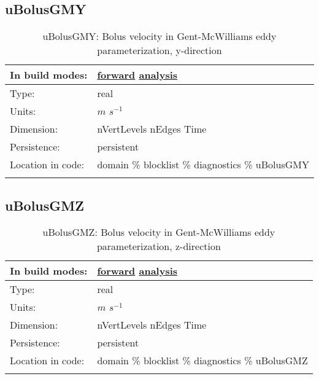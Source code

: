 \subsection[uBolusGMY]{uBolusGMY}
\label{subsec:var_sec_diagnostics_uBolusGMY}
\begin{center}
\begin{longtable}{| p{2.0in} | p{4.0in} |}
        \hline 
        In build modes: & \hyperref[subsec:forward_var_tab_diagnostics]{forward} \hyperref[subsec:analysis_var_tab_diagnostics]{analysis} \\
        \hline 
        Type: & real \\
        \hline 
        Units: & $m$ $s^{-1}$ \\
        \hline 
        Dimension: & nVertLevels nEdges Time \\
        \hline 
        Persistence: & persistent \\
        \hline 
		 Location in code: & domain \% blocklist \% diagnostics \% uBolusGMY \\
		 \hline 
    \caption{uBolusGMY: Bolus velocity in Gent-McWilliams eddy parameterization, y-direction}
\end{longtable}
\end{center}
\subsection[uBolusGMZ]{uBolusGMZ}
\label{subsec:var_sec_diagnostics_uBolusGMZ}
\begin{center}
\begin{longtable}{| p{2.0in} | p{4.0in} |}
        \hline 
        In build modes: & \hyperref[subsec:forward_var_tab_diagnostics]{forward} \hyperref[subsec:analysis_var_tab_diagnostics]{analysis} \\
        \hline 
        Type: & real \\
        \hline 
        Units: & $m$ $s^{-1}$ \\
        \hline 
        Dimension: & nVertLevels nEdges Time \\
        \hline 
        Persistence: & persistent \\
        \hline 
		 Location in code: & domain \% blocklist \% diagnostics \% uBolusGMZ \\
		 \hline 
    \caption{uBolusGMZ: Bolus velocity in Gent-McWilliams eddy parameterization, z-direction}
\end{longtable}
\end{center}
